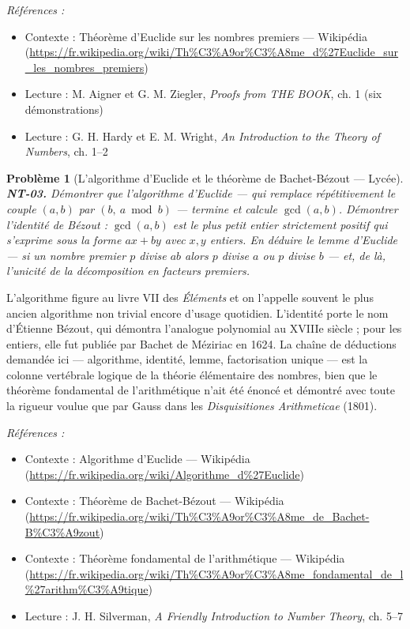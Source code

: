 \documentclass[11pt]{article}
\newtheorem{problem}{Problème}
\newenvironment{refs}{\par\small\noindent\emph{Références :}\begin{itemize}\setlength\itemsep{0pt}}{\end{itemize}\normalsize}
\begin{document}
\begin{refs}
\item Contexte : Théorème d'Euclide sur les nombres premiers --- Wikipédia (\url{https://fr.wikipedia.org/wiki/Th%C3%A9or%C3%A8me_d%27Euclide_sur_les_nombres_premiers})
\item Lecture : M. Aigner et G. M. Ziegler, \textit{Proofs from THE BOOK}, ch. 1 (six démonstrations)
\item Lecture : G. H. Hardy et E. M. Wright, \textit{An Introduction to the Theory of Numbers}, ch. 1--2
\end{refs}

\bigskip

\begin{problem}[{L'algorithme d'Euclide et le théorème de Bachet-Bézout --- Lycée}]
\textbf{NT-03.} Démontrer que l'algorithme d'Euclide --- qui remplace
répétitivement le couple $(a, b)$ par $(b,\ a \bmod b)$ --- termine et calcule $\gcd(a, b)$.
Démontrer l'identité de Bézout : $\gcd(a, b)$ est le plus petit entier strictement positif qui
s'exprime sous la forme $ax + by$ avec $x, y$ entiers. En déduire le lemme d'Euclide --- si un
nombre premier $p$ divise $ab$ alors $p$ divise $a$ ou $p$ divise $b$ --- et, de là,
l'unicité de la décomposition en facteurs premiers.
\end{problem}

\noindent L'algorithme figure au livre VII des \textit{Éléments} et on l'appelle souvent le
plus ancien algorithme non trivial encore d'usage quotidien. L'identité porte le nom d'Étienne
Bézout, qui démontra l'analogue polynomial au XVIIIe siècle ; pour les entiers, elle fut
publiée par Bachet de Méziriac en 1624. La chaîne de déductions demandée ici --- algorithme, identité,
lemme, factorisation unique --- est la colonne vertébrale logique de la théorie élémentaire des
nombres, bien que le théorème fondamental de l'arithmétique n'ait été énoncé et démontré avec toute
la rigueur voulue que par Gauss dans les \textit{Disquisitiones Arithmeticae} (1801).

\begin{refs}
\item Contexte : Algorithme d'Euclide --- Wikipédia (\url{https://fr.wikipedia.org/wiki/Algorithme_d%27Euclide})
\item Contexte : Théorème de Bachet-Bézout --- Wikipédia (\url{https://fr.wikipedia.org/wiki/Th%C3%A9or%C3%A8me_de_Bachet-B%C3%A9zout})
\item Contexte : Théorème fondamental de l'arithmétique --- Wikipédia (\url{https://fr.wikipedia.org/wiki/Th%C3%A9or%C3%A8me_fondamental_de_l%27arithm%C3%A9tique})
\item Lecture : J. H. Silverman, \textit{A Friendly Introduction to Number Theory}, ch. 5--7
\end{refs}
\end{document}
